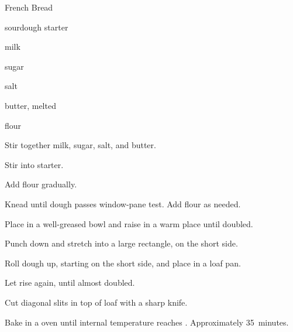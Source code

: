 \begin{recipe}{French Bread}{}{}

\begin{ingredients}
\item {} sourdough starter
\item \C{\half} milk
\item \Tp{1\eighth} sugar
\item \tp{2\quarter} salt
\item \C{\eighth} butter, melted
\item \C{1\twothird} flour
\end{ingredients}

\begin{directions}

\item Stir together milk, sugar, salt, and butter.
\item Stir into starter.
\item Add flour gradually.
\item Knead until dough passes window-pane test. Add flour as needed.
\item Place in a well-greased bowl and raise in a warm place until doubled.
\item Punch down and stretch into a large rectangle,  on the short side.
\item Roll dough up, starting on the short side, and place in a loaf pan.
\item Let rise again, until almost doubled.
\item Cut diagonal slits in top of loaf with a sharp knife.
\item Bake in a  oven until internal temperature reaches . Approximately 35~minutes.
\end{directions}
\end{recipe}
